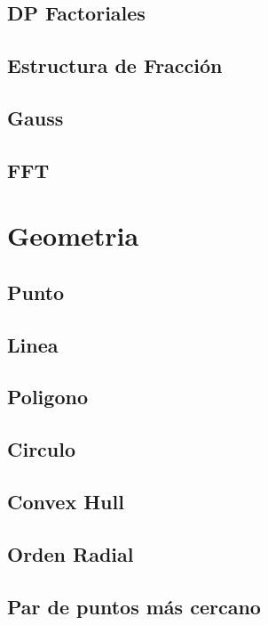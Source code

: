 \documentclass[a4paper,11pt,landscape,twocolumn]{article}
\begin{document}
\subsection{DP Factoriales}

\subsection{Estructura de Fracción}

\subsection{Gauss}

\subsection{FFT}


\section{Geometria} %
\subsection{Punto}

\subsection{Linea}

\subsection{Poligono}

\subsection{Circulo}

\subsection{Convex Hull}

\subsection{Orden Radial}

\subsection{Par de puntos más cercano}

\end{document}
